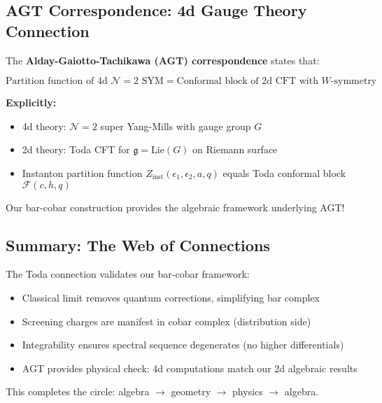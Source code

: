 \subsection{AGT Correspondence: 4d Gauge Theory Connection}

\begin{remark}
\label{rem:agt-correspondence}
The \textbf{Alday-Gaiotto-Tachikawa (AGT) correspondence} \cite{AGT2010} states that:

$$\text{Partition function of 4d } \mathcal{N}=2 \text{ SYM} = 
\text{Conformal block of 2d CFT with } W\text{-symmetry}$$

\textbf{Explicitly:}
\begin{itemize}
\item 4d theory: $\mathcal{N}=2$ super Yang-Mills with gauge group $G$
\item 2d theory: Toda CFT for $\mathfrak{g} = \text{Lie}(G)$ on Riemann surface
\item Instanton partition function $Z_{\text{inst}}(\epsilon_1, \epsilon_2, a, q)$ 
equals Toda conformal block $\mathcal{F}(c, h, q)$
\end{itemize}

Our bar-cobar construction provides the algebraic framework underlying AGT!
\end{remark}

\subsection{Summary: The Web of Connections}

\begin{remark}
The Toda connection validates our bar-cobar framework:
\begin{itemize}
\item Classical limit removes quantum corrections, simplifying bar complex
\item Screening charges are manifest in cobar complex (distribution side)
\item Integrability ensures spectral sequence degenerates (no higher differentials)
\item AGT provides physical check: 4d computations match our 2d algebraic results
\end{itemize}

This completes the circle: algebra $\to$ geometry $\to$ physics $\to$ algebra.
\end{remark}


